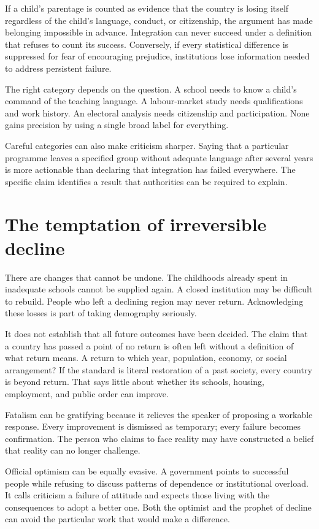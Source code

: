 \documentclass[12pt,a4paper]{book}
\begin{document}
If a child's parentage is counted as evidence that the country is losing itself regardless of the child's language, conduct, or citizenship, the argument has made belonging impossible in advance. Integration can never succeed under a definition that refuses to count its success. Conversely, if every statistical difference is suppressed for fear of encouraging prejudice, institutions lose information needed to address persistent failure.

The right category depends on the question. A school needs to know a child's command of the teaching language. A labour-market study needs qualifications and work history. An electoral analysis needs citizenship and participation. None gains precision by using a single broad label for everything.

Careful categories can also make criticism sharper. Saying that a particular programme leaves a specified group without adequate language after several years is more actionable than declaring that integration has failed everywhere. The specific claim identifies a result that authorities can be required to explain.

\section*{The temptation of irreversible decline}

There are changes that cannot be undone. The childhoods already spent in inadequate schools cannot be supplied again. A closed institution may be difficult to rebuild. People who left a declining region may never return. Acknowledging these losses is part of taking demography seriously.

It does not establish that all future outcomes have been decided. The claim that a country has passed a point of no return is often left without a definition of what return means. A return to which year, population, economy, or social arrangement? If the standard is literal restoration of a past society, every country is beyond return. That says little about whether its schools, housing, employment, and public order can improve.

Fatalism can be gratifying because it relieves the speaker of proposing a workable response. Every improvement is dismissed as temporary; every failure becomes confirmation. The person who claims to face reality may have constructed a belief that reality can no longer challenge.

Official optimism can be equally evasive. A government points to successful people while refusing to discuss patterns of dependence or institutional overload. It calls criticism a failure of attitude and expects those living with the consequences to adopt a better one. Both the optimist and the prophet of decline can avoid the particular work that would make a difference.
\end{document}
